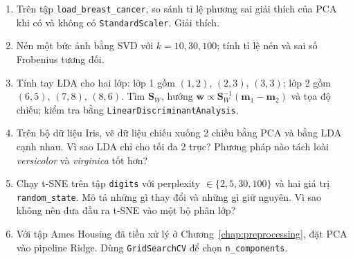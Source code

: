 \begin{enumerate}
    \item Trên tập \texttt{load\_breast\_cancer}, so sánh tỉ lệ phương sai giải thích của PCA khi có và không có \texttt{StandardScaler}. Giải thích.
    \item Nén một bức ảnh bằng SVD với $k = 10, 30, 100$; tính tỉ lệ nén và sai số Frobenius tương đối.
    \item Tính tay LDA cho hai lớp: lớp 1 gồm $(1, 2)$, $(2, 3)$, $(3, 3)$; lớp 2 gồm $(6, 5)$, $(7, 8)$, $(8, 6)$. Tìm $\mathbf{S}_W$, hướng $\mathbf{w} \propto \mathbf{S}_W^{-1}(\mathbf{m}_1 - \mathbf{m}_2)$ và tọa độ chiếu; kiểm tra bằng \texttt{LinearDiscriminantAnalysis}.
    \item Trên bộ dữ liệu Iris, vẽ dữ liệu chiếu xuống 2 chiều bằng PCA và bằng LDA cạnh nhau. Vì sao LDA chỉ cho tối đa 2 trục? Phương pháp nào tách loài \textit{versicolor} và \textit{virginica} tốt hơn?
    \item Chạy t-SNE trên tập \texttt{digits} với perplexity $\in \{2, 5, 30, 100\}$ và hai giá trị \texttt{random\_state}. Mô tả những gì thay đổi và những gì giữ nguyên. Vì sao không nên đưa đầu ra t-SNE vào một bộ phân lớp?
    \item Với tập Ames Housing đã tiền xử lý ở Chương~\ref{chap:preprocessing}, đặt PCA vào pipeline Ridge. Dùng \texttt{GridSearchCV} để chọn \texttt{n\_components}.
\end{enumerate}

